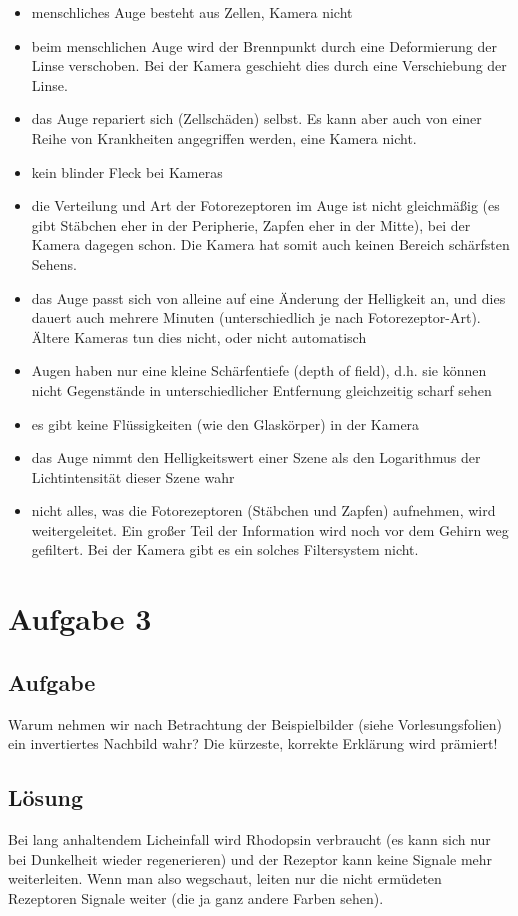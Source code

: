 \documentclass[12pt]{article}
\begin{document}
\begin{itemize}
\item menschliches Auge besteht aus Zellen, Kamera nicht
\item beim menschlichen Auge wird der Brennpunkt durch eine Deformierung der Linse verschoben. Bei der Kamera geschieht dies durch eine Verschiebung der Linse.
\item das Auge repariert sich (Zellsch\"aden) selbst. Es kann aber auch von einer Reihe von Krankheiten angegriffen werden, eine Kamera nicht.
\item kein blinder Fleck bei Kameras
\item die Verteilung und Art der Fotorezeptoren im Auge ist nicht gleichm\"a\ss ig (es gibt St\"abchen eher in der Peripherie, Zapfen eher in der Mitte), bei der Kamera dagegen schon. Die Kamera hat somit auch keinen Bereich sch\"arfsten Sehens.
\item das Auge passt sich von alleine auf eine \"Anderung der Helligkeit an, und dies dauert auch mehrere Minuten (unterschiedlich je nach Fotorezeptor-Art). \"Altere Kameras tun dies nicht, oder nicht automatisch
\item Augen haben nur eine kleine Sch\"arfentiefe (depth of field), d.h. sie k\"onnen nicht Gegenst\"ande in unterschiedlicher Entfernung gleichzeitig scharf sehen
\item es gibt keine Fl\"ussigkeiten (wie den Glask\"orper) in der Kamera
\item das Auge nimmt den Helligkeitswert einer Szene als den Logarithmus der Lichtintensität dieser Szene wahr
\item nicht alles, was die Fotorezeptoren (St\"abchen und Zapfen) aufnehmen, wird weitergeleitet. Ein großer Teil der Information wird noch vor dem Gehirn weg gefiltert. Bei der Kamera gibt es ein solches Filtersystem nicht.
\end{itemize}

\newpage

\section{Aufgabe 3}

\subsection{Aufgabe}

Warum nehmen wir nach Betrachtung der Beispielbilder (siehe Vorlesungsfolien) ein invertiertes Nachbild wahr? Die k\"urzeste, korrekte Erkl\"arung wird pr\"amiert!

\subsection{L\"osung}

Bei lang anhaltendem Licheinfall wird Rhodopsin verbraucht (es kann sich nur bei Dunkelheit wieder regenerieren) und der Rezeptor kann keine Signale mehr weiterleiten. Wenn man also wegschaut, leiten nur die nicht erm\"udeten Rezeptoren Signale weiter (die ja ganz andere Farben sehen). 
\end{document}
